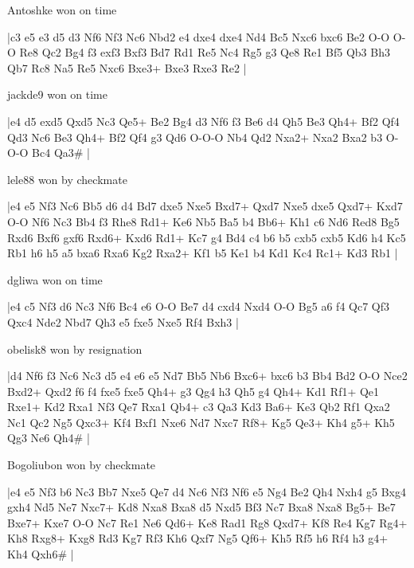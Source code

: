 \showboard

Antoshke won on time

\makegametitle
|c3 e5 e3 d5 d3 Nf6 Nf3 Nc6 Nbd2 e4 dxe4 dxe4 Nd4 Bc5 Nxc6 bxc6 Be2 O-O O-O Re8 Qc2 Bg4 f3 exf3 Bxf3 Bd7 Rd1 Re5 Nc4 Rg5 g3 Qe8 Re1 Bf5 Qb3 Bh3 Qb7 Rc8 Na5 Re5 Nxc6 Bxe3+ Bxe3 Rxe3 Re2  |

\showboard

jackde9 won on time

\makegametitle
|e4 d5 exd5 Qxd5 Nc3 Qe5+ Be2 Bg4 d3 Nf6 f3 Be6 d4 Qh5 Be3 Qh4+ Bf2 Qf4 Qd3 Nc6 Be3 Qh4+ Bf2 Qf4 g3 Qd6 O-O-O Nb4 Qd2 Nxa2+ Nxa2 Bxa2 b3 O-O-O Bc4 Qa3\#  |

\showboard

lele88 won by checkmate

\makegametitle
|e4 e5 Nf3 Nc6 Bb5 d6 d4 Bd7 dxe5 Nxe5 Bxd7+ Qxd7 Nxe5 dxe5 Qxd7+ Kxd7 O-O Nf6 Nc3 Bb4 f3 Rhe8 Rd1+ Ke6 Nb5 Ba5 b4 Bb6+ Kh1 c6 Nd6 Red8 Bg5 Rxd6 Bxf6 gxf6 Rxd6+ Kxd6 Rd1+ Kc7 g4 Bd4 c4 b6 b5 cxb5 cxb5 Kd6 h4 Kc5 Rb1 h6 h5 a5 bxa6 Rxa6 Kg2 Rxa2+ Kf1 b5 Ke1 b4 Kd1 Kc4 Rc1+ Kd3 Rb1  |

\showboard

dgliwa won on time

\makegametitle
|e4 c5 Nf3 d6 Nc3 Nf6 Bc4 e6 O-O Be7 d4 cxd4 Nxd4 O-O Bg5 a6 f4 Qc7 Qf3 Qxc4 Nde2 Nbd7 Qh3 e5 fxe5 Nxe5 Rf4 Bxh3  |

\showboard

obelisk8 won by resignation

\makegametitle
|d4 Nf6 f3 Nc6 Nc3 d5 e4 e6 e5 Nd7 Bb5 Nb6 Bxc6+ bxc6 b3 Bb4 Bd2 O-O Nce2 Bxd2+ Qxd2 f6 f4 fxe5 fxe5 Qh4+ g3 Qg4 h3 Qh5 g4 Qh4+ Kd1 Rf1+ Qe1 Rxe1+ Kd2 Rxa1 Nf3 Qe7 Rxa1 Qb4+ c3 Qa3 Kd3 Ba6+ Ke3 Qb2 Rf1 Qxa2 Nc1 Qc2 Ng5 Qxc3+ Kf4 Bxf1 Nxe6 Nd7 Nxc7 Rf8+ Kg5 Qe3+ Kh4 g5+ Kh5 Qg3 Ne6 Qh4\#  |

\showboard

Bogoliubon won by checkmate

\makegametitle
|e4 e5 Nf3 b6 Nc3 Bb7 Nxe5 Qe7 d4 Nc6 Nf3 Nf6 e5 Ng4 Be2 Qh4 Nxh4 g5 Bxg4 gxh4 Nd5 Ne7 Nxc7+ Kd8 Nxa8 Bxa8 d5 Nxd5 Bf3 Nc7 Bxa8 Nxa8 Bg5+ Be7 Bxe7+ Kxe7 O-O Nc7 Re1 Ne6 Qd6+ Ke8 Rad1 Rg8 Qxd7+ Kf8 Re4 Kg7 Rg4+ Kh8 Rxg8+ Kxg8 Rd3 Kg7 Rf3 Kh6 Qxf7 Ng5 Qf6+ Kh5 Rf5 h6 Rf4 h3 g4+ Kh4 Qxh6\#  |

